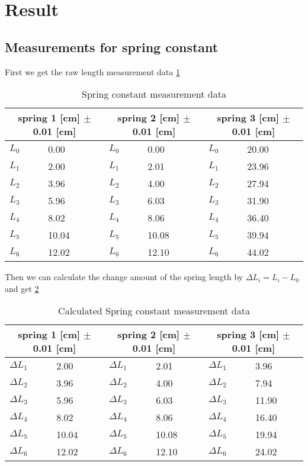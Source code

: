 \section{Result}

\subsection{Measurements for spring constant}

First we get the raw length measurement data \ref{s1}
\begin{table}[H]
\centering
\begin{tabular}{|p{0.7cm}|p{3cm}||p{0.7cm}|p{3cm}||p{0.7cm}|p{3cm}|}
\hline
\multicolumn{2}{|c|}{spring 1 [cm] $\pm$ 0.01 [cm]} &
\multicolumn{2}{|c|}{spring 2 [cm] $\pm$ 0.01 [cm]} &
\multicolumn{2}{|c|}{spring 3 [cm] $\pm$ 0.01 [cm]} \\ \hline
$L_0$ & 0.00  & $L_0$ & 0.00  & $L_0$ & 20.00 \\ \hline
$L_1$ & 2.00  & $L_1$ & 2.01  & $L_1$ & 23.96 \\ \hline
$L_2$ & 3.96  & $L_2$ & 4.00  & $L_2$ & 27.94 \\ \hline
$L_3$ & 5.96  & $L_3$ & 6.03  & $L_3$ & 31.90 \\ \hline
$L_4$ & 8.02  & $L_4$ & 8.06  & $L_4$ & 36.40 \\ \hline
$L_5$ & 10.04 & $L_5$ & 10.08 & $L_5$ & 39.94 \\ \hline
$L_6$ & 12.02 & $L_6$ & 12.10 & $L_6$ & 44.02 \\ \hline
\end{tabular}
\caption{Spring constant measurement data}
\label{s1}
\end{table}

Then we can calculate the change amount of the spring length by $\Delta L_i=L_i-L_0$ and get \ref{s2}

\begin{table}[H]
\centering
\begin{tabular}{|p{0.7cm}|p{3cm}|p{0.7cm}|p{3cm}|p{0.7cm}|p{3cm}|}
\hline
\multicolumn{2}{|c|}{spring 1 [cm] $\pm$ 0.01 [cm]} &
\multicolumn{2}{|c|}{spring 2 [cm] $\pm$ 0.01 [cm]} &
\multicolumn{2}{|c|}{spring 3 [cm] $\pm$ 0.01 [cm]} \\ \hline
$\Delta L_1$ & 2.00  & $\Delta L_1$ & 2.01  & $\Delta L_1$ & 3.96  \\ \hline
$\Delta L_2$ & 3.96  & $\Delta L_2$ & 4.00  & $\Delta L_2$ & 7.94  \\ \hline
$\Delta L_3$ & 5.96  & $\Delta L_3$ & 6.03  & $\Delta L_3$ & 11.90 \\ \hline
$\Delta L_4$ & 8.02  & $\Delta L_4$ & 8.06  & $\Delta L_4$ & 16.40 \\ \hline
$\Delta L_5$ & 10.04 & $\Delta L_5$ & 10.08 & $\Delta L_5$ & 19.94 \\ \hline
$\Delta L_6$ & 12.02 & $\Delta L_6$ & 12.10 & $\Delta L_6$ & 24.02 \\ \hline
\end{tabular}
\caption{Calculated Spring constant measurement data}
\label{s2}
\end{table}
